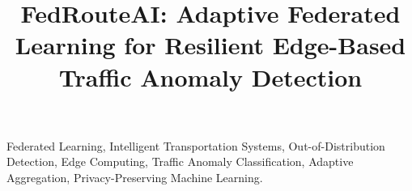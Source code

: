 \documentclass[conference]{IEEEtran}
\begin{document}

\title{FedRouteAI: Adaptive Federated Learning for Resilient
Edge-Based Traffic Anomaly Detection}

\author{
}

\maketitle



\begin{IEEEkeywords}
Federated Learning, Intelligent Transportation Systems, Out-of-Distribution Detection, Edge Computing, Traffic Anomaly Classification, Adaptive Aggregation, Privacy-Preserving Machine Learning.
\end{IEEEkeywords}








\balance


\end{document}
